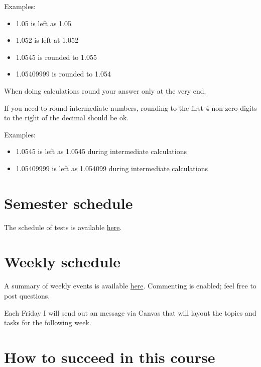 \documentclass[
]{book}
\providecommand{\tightlist}{%
  \setlength{\itemsep}{0pt}\setlength{\parskip}{0pt}}
\begin{document}
Examples:

\begin{itemize}
\tightlist
\item
  1.05 is left as 1.05
\item
  1.052 is left at 1.052
\item
  1.0545 is rounded to 1.055
\item
  1.05409999 is rounded to 1.054
\end{itemize}

When doing calculations round your answer only at the very end.

If you need to round intermediate numbers, rounding to the first 4 non-zero digits to the right of the decimal should be ok.

Examples:

\begin{itemize}
\tightlist
\item
  1.0545 is left as 1.0545 during intermediate calculations
\item
  1.05409999 is left as 1.054099 during intermediate calculations
\end{itemize}

\hypertarget{semester-schedule}{%
\chapter{Semester schedule}\label{semester-schedule}}

The schedule of tests is available \href{https://docs.google.com/spreadsheets/d/1LAogpj5NgGj259ojV7maC1y64IvkHvtlDm8EGS46Ex0/edit?usp=sharing}{here}.

\hypertarget{weekly-schedule}{%
\chapter{Weekly schedule}\label{weekly-schedule}}

A summary of weekly events is available \href{https://docs.google.com/spreadsheets/d/1jxEavcRU4_lom0_x7q4YgjAeHo5lNMWX3kDjdNyVKfo/edit?usp=sharing}{here}. Commenting is enabled; feel free to post questions.

Each Friday I will send out an message via Canvas that will layout the topics and tasks for the following week.

\hypertarget{how-to-succeed-in-this-course}{%
\chapter{How to succeed in this course}\label{how-to-succeed-in-this-course}}
\end{document}
